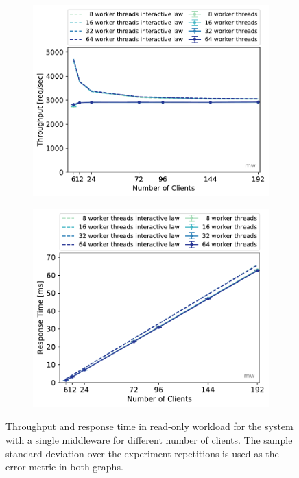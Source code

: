 \documentclass[report.tex]{subfiles}
\begin{document}
\begin{figure}
	\begin{subfigure}[b]{.499\linewidth}
		\centering
		\includegraphics[width=\linewidth]{data/exp31_ro_tp_nc_w.pdf}
	\end{subfigure}\hfill
	\begin{subfigure}[b]{.499\linewidth}
		\centering
		\includegraphics[width=\linewidth]{data/exp31_ro_rt_nc_w.pdf}
	\end{subfigure}%
	\caption{Throughput and response time in read-only workload for the system with a single middleware for different number of clients. The sample standard deviation over the experiment repetitions is used as the error metric in both graphs.}\label{exp31_ro_tp_nc}
\end{figure}
\end{document}
